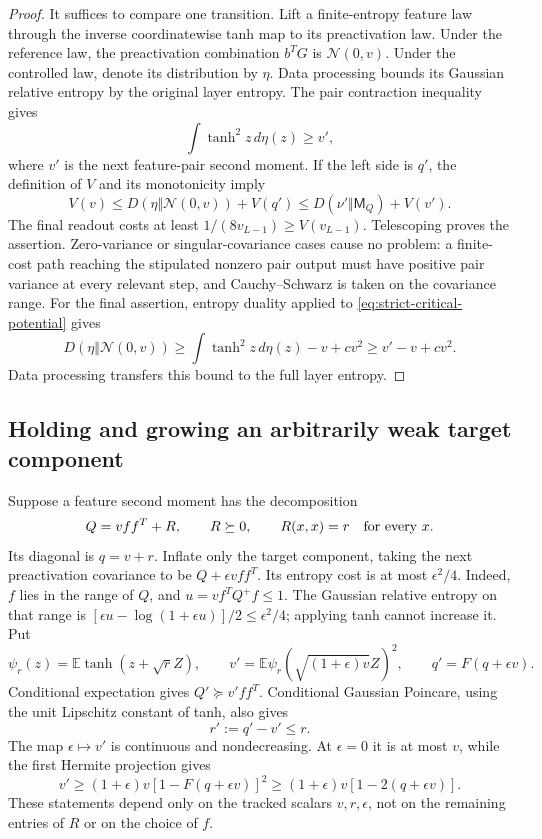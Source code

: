 \begin{proof}
It suffices to compare one transition. Lift a finite-entropy feature
law through the inverse coordinatewise tanh map to its preactivation
law. Under the reference law, the preactivation combination $b^TG$ is
$\mathcal N(0,v)$. Under the controlled law, denote its distribution by
$\eta$. Data processing bounds its Gaussian relative entropy by the
original layer entropy. The pair contraction inequality gives
\[
 \int\tanh^2z\,d\eta(z)\ge v',
\]
where $v'$ is the next feature-pair second moment. If the left side is
$q'$, the definition of $V$ and its monotonicity imply
\[
 V(v)\le D(\eta\Vert\mathcal N(0,v))+V(q')
       \le D(\nu'\Vert\mathsf M_Q)+V(v').
\]
The final readout costs at least $1/(8v_{L-1})\ge V(v_{L-1})$.
Telescoping proves the assertion. Zero-variance or singular-covariance
cases cause no problem: a finite-cost path reaching the stipulated
nonzero pair output must have positive pair variance at every relevant
step, and Cauchy--Schwarz is taken on the covariance range.
For the final assertion, entropy duality applied to
\eqref{eq:strict-critical-potential} gives
\[
 D(\eta\Vert\mathcal N(0,v))
 \ge \int\tanh^2z\,d\eta(z)-v+cv^2
 \ge v'-v+cv^2.
\]
Data processing transfers this bound to the full layer entropy.
\end{proof}

\subsection{Holding and growing an arbitrarily weak target component}

Suppose a feature second moment has the decomposition
\[
 Q=vff^T+R,\qquad R\succeq0,\qquad R(x,x)=r\quad\hbox{for every }x.
\]
Its diagonal is $q=v+r$. Inflate only the target component, taking the
next preactivation covariance to be $Q+\epsilon vff^T$.
Its entropy cost is at most $\epsilon^2/4$. Indeed, $f$ lies in the
range of $Q$, and $u=vf^TQ^+f\le1$. The Gaussian relative entropy
on that range is
$[\epsilon u-\log(1+\epsilon u)]/2\le\epsilon^2/4$;
applying tanh cannot increase it. Put
\[
 \psi_r(z)=\mathbb E\tanh(z+\sqrt rZ),\qquad
 v'=\mathbb E\psi_r(\sqrt{(1+\epsilon)v}Z)^2,
 \qquad q'=F(q+\epsilon v).
\]
Conditional expectation gives $Q'\succeq v'ff^T$.
Conditional Gaussian Poincare, using the unit Lipschitz constant of tanh,
also gives
\begin{equation}\label{eq:critical-residual-nonincreasing}
 r':=q'-v'\le r.
\end{equation}
The map $\epsilon\mapsto v'$ is continuous and nondecreasing. At
$\epsilon=0$ it is at most $v$, while the first Hermite projection gives
\begin{equation}\label{eq:critical-component-growth}
 v'\ge(1+\epsilon)v[1-F(q+\epsilon v)]^2
       \ge(1+\epsilon)v[1-2(q+\epsilon v)].
\end{equation}
These statements depend only on the tracked scalars $v,r,\epsilon$,
not on the remaining entries of $R$ or on the choice of $f$.

